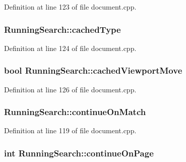 Definition at line 123 of file document.\+cpp.

\hypertarget{structRunningSearch_a1b4026cf76ef3dce1f2b8b831670d784}{
\subsubsection[{cached\+Type}]{ Running\+Search\+::cached\+Type}}\label{structRunningSearch_a1b4026cf76ef3dce1f2b8b831670d784}


Definition at line 124 of file document.\+cpp.

\hypertarget{structRunningSearch_a82fb2c89035371061b259d4f1b62ff35}{
\subsubsection[{cached\+Viewport\+Move}]{\setlength{\rightskip}{0pt plus 5cm}bool Running\+Search\+::cached\+Viewport\+Move}}\label{structRunningSearch_a82fb2c89035371061b259d4f1b62ff35}


Definition at line 126 of file document.\+cpp.

\hypertarget{structRunningSearch_acd3938eb8c9ccc97de83af80d68e55bf}{
\subsubsection[{continue\+On\+Match}]{ Running\+Search\+::continue\+On\+Match}}\label{structRunningSearch_acd3938eb8c9ccc97de83af80d68e55bf}


Definition at line 119 of file document.\+cpp.

\hypertarget{structRunningSearch_a69213b1663cb154fee0cca4b877c4c05}{
\subsubsection[{continue\+On\+Page}]{\setlength{\rightskip}{0pt plus 5cm}int Running\+Search\+::continue\+On\+Page}}\label{structRunningSearch_a69213b1663cb154fee0cca4b877c4c05}


